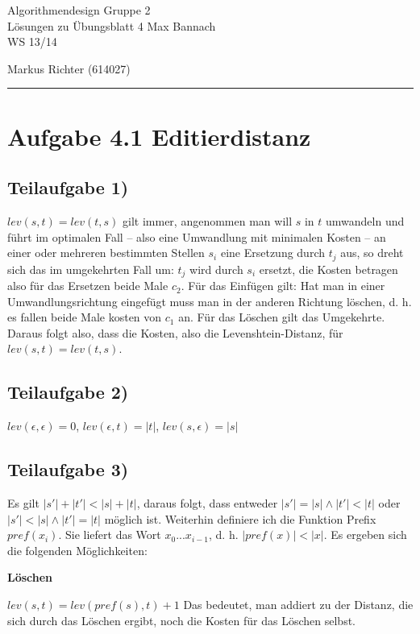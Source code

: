 \documentclass[a4paper, fontsize=10pt]{scrartcl}
\begin{document}
 

{\large Algorithmendesign \hfill Gruppe 2}\\  
{\large Lösungen zu Übungsblatt 4} \hfill Max Bannach\\
{\large WS 13/14}
\begin{flushright}Markus Richter (614027)\end{flushright}
\rule{\textwidth}{.3mm}

\section*{Aufgabe 4.1 Editierdistanz}
\subsection*{Teilaufgabe 1)}

$lev(s,t)=lev(t,s)$ gilt immer, angenommen man will $s$ in $t$ umwandeln und führt im optimalen Fall -- also eine Umwandlung mit minimalen Kosten -- an einer oder mehreren bestimmten Stellen $s_i$ eine Ersetzung durch $t_j$ aus, so dreht sich das im umgekehrten Fall um: $t_j$ wird durch $s_i$ ersetzt, die Kosten betragen also für das Ersetzen beide Male $c_2$. Für das Einfügen gilt: Hat man in einer Umwandlungsrichtung eingefügt muss man in der anderen Richtung löschen, d. h. es fallen beide Male kosten von $c_1$ an. Für das Löschen gilt das Umgekehrte. Daraus folgt also, dass die Kosten, also die Levenshtein-Distanz, für $lev(s,t)=lev(t,s) $.

\subsection*{Teilaufgabe 2)}
$lev(\epsilon,\epsilon)=0 $, $lev(\epsilon,t)=|t|$, $lev(s,\epsilon)=|s|$

\subsection*{Teilaufgabe 3)}
Es gilt $|s'|+|t'|<|s|+|t|$, daraus folgt, dass entweder $|s'|=|s| \wedge |t'|<|t|$ oder $|s'|<|s|\wedge |t'|=|t|$ möglich ist. Weiterhin definiere ich die Funktion Prefix $pref(x_i)$. Sie liefert das Wort $x_0...x_{i-1}$, d. h. $|pref(x)|<|x|$. Es ergeben sich die folgenden Möglichkeiten:\bigskip

\textbf{Löschen}\smallskip

$lev(s,t)=lev(pref(s),t)+1$
Das bedeutet, man addiert zu der Distanz, die sich durch das Löschen ergibt, noch die Kosten für das Löschen selbst.\bigskip
\end{document}
